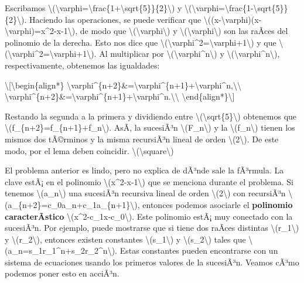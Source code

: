 Escribamos
{\textbackslash(\textbackslash varphi=\textbackslash frac\{1+\textbackslash sqrt\{5\}\}\{2\}\textbackslash)}
y
{\textbackslash(\textbackslash varphi\textquotesingle=\textbackslash frac\{1-\textbackslash sqrt\{5\}\}\{2\}\textbackslash)}.
Haciendo las operaciones, se puede verificar que
{\textbackslash((x-\textbackslash varphi)(x-\textbackslash varphi\textquotesingle)=x\^{}2-x-1\textbackslash)},
de modo que {\textbackslash(\textbackslash varphi\textbackslash)} y
{\textbackslash(\textbackslash varphi\textquotesingle\textbackslash)}
son las raÃ­ces del polinomio de la derecha. Esto nos dice que
{\textbackslash(\textbackslash varphi\^{}2=\textbackslash varphi+1\textbackslash)}
y que
{\textbackslash(\textbackslash varphi\textquotesingle\^{}2=\textbackslash varphi\textquotesingle+1\textbackslash)}.
Al multiplicar por
{\textbackslash(\textbackslash varphi\^{}n\textbackslash)} y
{\textbackslash(\textbackslash varphi\textquotesingle\^{}n\textbackslash)},
respectivamente, obtenemos las igualdades:

\textbackslash{[}\textbackslash begin\{align*\}
\textbackslash varphi\^{}\{n+2\}\&=\textbackslash varphi\^{}\{n+1\}+\textbackslash varphi\^{}n,\textbackslash\textbackslash{}
\textbackslash varphi\textquotesingle\^{}\{n+2\}\&=\textbackslash varphi\textquotesingle\^{}\{n+1\}+\textbackslash varphi\textquotesingle\^{}n.\textbackslash\textbackslash{}
\textbackslash end\{align*\}\textbackslash{]}

Restando la segunda a la primera y dividiendo entre
{\textbackslash(\textbackslash sqrt\{5\}\textbackslash)} obtenemos que
{\textbackslash(f\_\{n+2\}=f\_\{n+1\}+f\_n\textbackslash)}. AsÃ­, la
sucesiÃ³n {\textbackslash(F\_n\textbackslash)} y la
{\textbackslash(f\_n\textbackslash)} tienen los mismos dos tÃ©rminos y
la misma recursiÃ³n lineal de orden {\textbackslash(2\textbackslash)}.
De este modo, por el lema deben coincidir.
{{\textbackslash(\textbackslash square\textbackslash)}}

El problema anterior es lindo, pero no explica de dÃ³nde sale la
fÃ³rmula. La clave estÃ¡ en el polinomio
{\textbackslash(x\^{}2-x-1\textbackslash)} que se menciona durante el
problema. Si tenemos {\textbackslash(a\_n\textbackslash)} una sucesiÃ³n
recursiva lineal de orden {\textbackslash(2\textbackslash)} con
recursiÃ³n
{\textbackslash(a\_\{n+2\}=c\_0a\_n+c\_1a\_\{n+1\}\textbackslash)},
entonces podemos asociarle el \textbf{polinomio caracterÃ­stico}
{\textbackslash(x\^{}2-c\_1x-c\_0\textbackslash)}. Este polinomio estÃ¡
muy conectado con la sucesiÃ³n. Por ejemplo, puede mostrarse que si
tiene dos raÃ­ces distintas {\textbackslash(r\_1\textbackslash)} y
{\textbackslash(r\_2\textbackslash)}, entonces existen constantes
{\textbackslash(s\_1\textbackslash)} y
{\textbackslash(s\_2\textbackslash)} tales que
{\textbackslash(a\_n=s\_1r\_1\^{}n+s\_2r\_2\^{}n\textbackslash)}. Estas
constantes pueden encontrarse con un sistema de ecuaciones usando los
primeros valores de la sucesiÃ³n. Veamos cÃ³mo podemos poner esto en
acciÃ³n.

